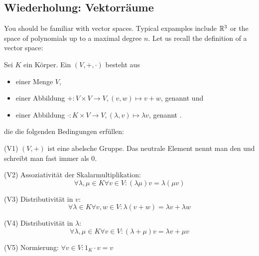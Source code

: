 
\subsection{Wiederholung: Vektorräume}

You should be familiar with vector spaces. Typical expamples include $\mathbb{R}^3$ or the space of polynomials up to a maximal degree $n$. Let us recall the definition of a vector space:

\begin{definition}[Vektorräume]\label{vektorraeume:def}
	Sei $K$ ein Körper. Ein  $(V,+,\cdot)$ besteht aus
	\begin{itemize}
		\item einer Menge $V$,
		\item einer Abbildung $+: V \times V \to V, (v,w) \mapsto v+w$, genannt  und
		\item einer Abbildung $\cdot: K \times V \to V, (\lambda,v) \mapsto \lambda v$, genannt .
	\end{itemize}
	die die folgenden Bedingungen erfüllen:
	\begin{description}
		\item{(V1)} $(V,+)$ ist eine abelsche Gruppe. Das neutrale Element nennt man den  und schreibt man fast immer als $0$.
		\item{(V2)} Assoziativität der Skalarmultiplikation:
		\[\forall\lambda,\mu\in K \forall v\in V: (\lambda \mu)v = \lambda(\mu v)\]
		\item{(V3)} Distributivität in $v$:
		\[\forall\lambda\in K \forall v,w\in V: \lambda (v+w) = \lambda v + \lambda w\]
		\item{(V4)} Distributivität in $\lambda$:
		\[\forall\lambda,\mu\in K \forall v\in V: (\lambda+\mu) v = \lambda v + \mu v\]
		\item{(V5)} Normierung: $\forall v\in V: 1_K \cdot v=v$
	\end{description}
\end{definition}


